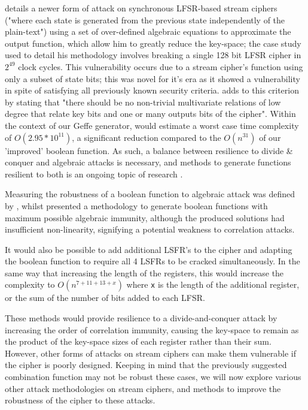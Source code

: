 \documentclass[british,10pt,a4paper]{article}
\begin{document}
\citet{courtois} details a newer form of attack on synchronous LFSR-based stream ciphers ("where each state is generated from the previous state independently of the plain-text") using a set of over-defined algebraic equations to approximate the output function, which allow him to greatly reduce the key-space; the case study used to detail his methodology involves breaking a single 128 bit LFSR cipher in \(2^{49}\) clock cycles. This vulnerability occurs due to a stream cipher's function using only a subset of state bits; this was novel for it's era as it showed a vulnerability in spite of satisfying all previously known security criteria. \citeauthor{courtois} adds to this criterion by stating that "there should be no non-trivial multivariate relations of low degree that relate key bits and one or many outputs bits of the cipher". Within the context of our Geffe generator, \citeauthor{courtois} would estimate a worst case time complexity of \(O(2.95 * 10^{11})\), a significant reduction compared to the \(O(n^{31})\) of our 'improved' boolean function. As such, a balance between resilience to divide \& conquer and algebraic attacks is necessary, and methods to generate functions resilient to both is an ongoing topic of research \cite{Carlet2010-ew}.

Measuring the robustness of a boolean function to algebraic attack was defined by \citet{Armknecht2006-sj}, whilst \citet{carlet} presented a methodology to generate boolean functions with maximum possible algebraic immunity, although the produced solutions had insufficient non-linearity, signifying a potential weakness to correlation attacks.


It would also be possible to add additional LSFR's to the cipher and adapting the boolean function to require all 4 LSFRs to be cracked simultaneously. In the same way that increasing the length of the registers, this would increase the complexity to \(O(n^{7+11+13+x})\) where \lstinline{x} is the length of the additional register, or the sum of the number of bits added to each LFSR.

These methods would provide resilience to a divide-and-conquer attack by increasing the order of correlation immunity, causing the key-space to remain as the product of the key-space sizes of each register rather than their sum. However, other forms of attacks on stream ciphers can make them vulnerable if the cipher is poorly designed. Keeping in mind that the previously suggested combination function may not be robust these cases, we will now explore various other attack methodologies on stream ciphers, and methods to improve the robustness of the cipher to these attacks.
\end{document}
